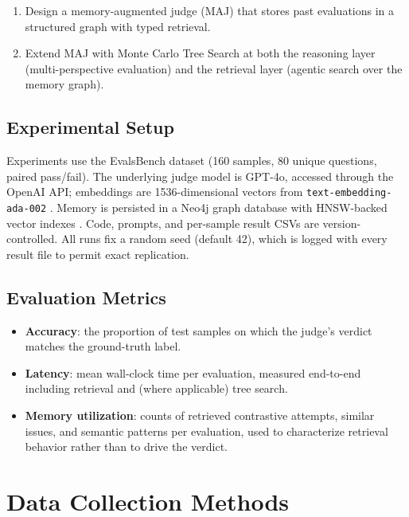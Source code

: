 \documentclass[12pt,a4paper]{report}
\begin{document}
\begin{enumerate}
    \item Design a memory-augmented judge (MAJ) that stores past evaluations in a structured graph with typed retrieval.
    \item Extend MAJ with Monte Carlo Tree Search at both the reasoning layer (multi-perspective evaluation) and the retrieval layer (agentic search over the memory graph).
\end{enumerate}

\subsection{Experimental Setup}

Experiments use the EvalsBench dataset \cite{evalsbench2024} (160 samples, 80 unique questions, paired pass/fail). The underlying judge model is GPT-4o, accessed through the OpenAI API; embeddings are 1536-dimensional vectors from \texttt{text-embedding-ada-002} \cite{openai_embeddings2024}. Memory is persisted in a Neo4j graph database with HNSW-backed vector indexes \cite{neo4j2023}. Code, prompts, and per-sample result CSVs are version-controlled. All runs fix a random seed (default 42), which is logged with every result file to permit exact replication.

\subsection{Evaluation Metrics}

\begin{itemize}
    \item \textbf{Accuracy}: the proportion of test samples on which the judge's verdict matches the ground-truth label.
    \item \textbf{Latency}: mean wall-clock time per evaluation, measured end-to-end including retrieval and (where applicable) tree search.
    \item \textbf{Memory utilization}: counts of retrieved contrastive attempts, similar issues, and semantic patterns per evaluation, used to characterize retrieval behavior rather than to drive the verdict.
\end{itemize}

\section{Data Collection Methods}
\label{sec:data-collection}
\end{document}
